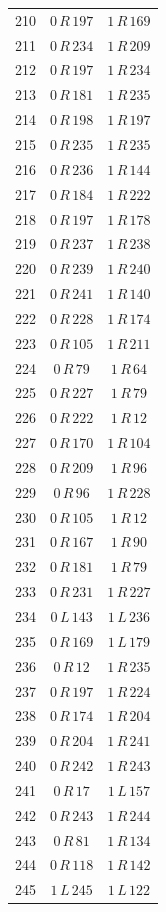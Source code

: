 \begin{longtable}{rcc}
210 & $0\,R\,197$ & $1\,R\,169$\\
211 & $0\,R\,234$ & $1\,R\,209$\\
212 & $0\,R\,197$ & $1\,R\,234$\\
213 & $0\,R\,181$ & $1\,R\,235$\\
214 & $0\,R\,198$ & $1\,R\,197$\\
215 & $0\,R\,235$ & $1\,R\,235$\\
216 & $0\,R\,236$ & $1\,R\,144$\\
217 & $0\,R\,184$ & $1\,R\,222$\\
218 & $0\,R\,197$ & $1\,R\,178$\\
219 & $0\,R\,237$ & $1\,R\,238$\\
220 & $0\,R\,239$ & $1\,R\,240$\\
221 & $0\,R\,241$ & $1\,R\,140$\\
222 & $0\,R\,228$ & $1\,R\,174$\\
223 & $0\,R\,105$ & $1\,R\,211$\\
224 & $0\,R\,79$ & $1\,R\,64$\\
225 & $0\,R\,227$ & $1\,R\,79$\\
226 & $0\,R\,222$ & $1\,R\,12$\\
227 & $0\,R\,170$ & $1\,R\,104$\\
228 & $0\,R\,209$ & $1\,R\,96$\\
229 & $0\,R\,96$ & $1\,R\,228$\\
230 & $0\,R\,105$ & $1\,R\,12$\\
231 & $0\,R\,167$ & $1\,R\,90$\\
232 & $0\,R\,181$ & $1\,R\,79$\\
233 & $0\,R\,231$ & $1\,R\,227$\\
234 & $0\,L\,143$ & $1\,L\,236$\\
235 & $0\,R\,169$ & $1\,L\,179$\\
236 & $0\,R\,12$ & $1\,R\,235$\\
237 & $0\,R\,197$ & $1\,R\,224$\\
238 & $0\,R\,174$ & $1\,R\,204$\\
239 & $0\,R\,204$ & $1\,R\,241$\\
240 & $0\,R\,242$ & $1\,R\,243$\\
241 & $0\,R\,17$ & $1\,L\,157$\\
242 & $0\,R\,243$ & $1\,R\,244$\\
243 & $0\,R\,81$ & $1\,R\,134$\\
244 & $0\,R\,118$ & $1\,R\,142$\\
245 & $1\,L\,245$ & $1\,L\,122$\\
\end{longtable}
\normalsize
